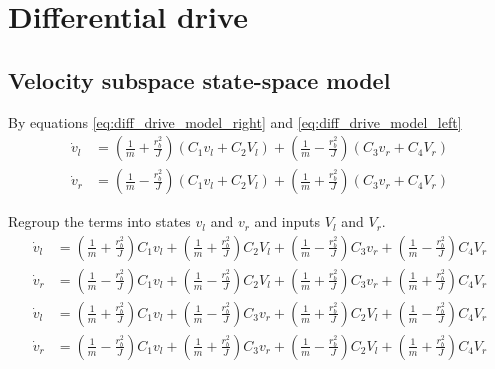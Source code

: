 \section{Differential drive}
\label{sec:ss_model_differential_drive}

\subsection{Velocity subspace state-space model}

By equations \eqref{eq:diff_drive_model_right} and
\eqref{eq:diff_drive_model_left}
\begin{align*}
  \dot{v}_l &= \left(\frac{1}{m} + \frac{r_b^2}{J}\right)
    \left(C_1 v_l + C_2 V_l\right) +
    \left(\frac{1}{m} - \frac{r_b^2}{J}\right) \left(C_3 v_r + C_4 V_r\right) \\
  \dot{v}_r &= \left(\frac{1}{m} - \frac{r_b^2}{J}\right)
    \left(C_1 v_l + C_2 V_l\right) +
    \left(\frac{1}{m} + \frac{r_b^2}{J}\right) \left(C_3 v_r + C_4 V_r\right)
\end{align*}

Regroup the terms into states $v_l$ and $v_r$ and inputs $V_l$ and $V_r$.
\begin{align*}
  \dot{v}_l &= \left(\frac{1}{m} + \frac{r_b^2}{J}\right) C_1 v_l +
    \left(\frac{1}{m} + \frac{r_b^2}{J}\right) C_2 V_l +
    \left(\frac{1}{m} - \frac{r_b^2}{J}\right) C_3 v_r +
    \left(\frac{1}{m} - \frac{r_b^2}{J}\right) C_4 V_r \\
  \dot{v}_r &= \left(\frac{1}{m} - \frac{r_b^2}{J}\right) C_1 v_l +
    \left(\frac{1}{m} - \frac{r_b^2}{J}\right) C_2 V_l +
    \left(\frac{1}{m} + \frac{r_b^2}{J}\right) C_3 v_r +
    \left(\frac{1}{m} + \frac{r_b^2}{J}\right) C_4 V_r
\end{align*}
\begin{align*}
  \dot{v}_l &= \left(\frac{1}{m} + \frac{r_b^2}{J}\right) C_1 v_l +
    \left(\frac{1}{m} - \frac{r_b^2}{J}\right) C_3 v_r +
    \left(\frac{1}{m} + \frac{r_b^2}{J}\right) C_2 V_l +
    \left(\frac{1}{m} - \frac{r_b^2}{J}\right) C_4 V_r \\
  \dot{v}_r &= \left(\frac{1}{m} - \frac{r_b^2}{J}\right) C_1 v_l +
    \left(\frac{1}{m} + \frac{r_b^2}{J}\right) C_3 v_r +
    \left(\frac{1}{m} - \frac{r_b^2}{J}\right) C_2 V_l +
    \left(\frac{1}{m} + \frac{r_b^2}{J}\right) C_4 V_r
\end{align*}

